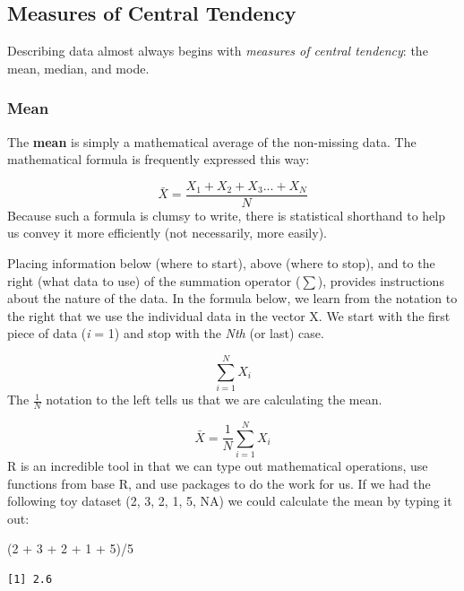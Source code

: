 \documentclass[
  11pt,
]{book}
\newenvironment{Shaded}{\begin{snugshade}}{\end{snugshade}}
\newcommand{\DecValTok}[1]{\textcolor[rgb]{0.00,0.00,0.81}{#1}}
\newcommand{\NormalTok}[1]{#1}
\newcommand{\SpecialCharTok}[1]{\textcolor[rgb]{0.00,0.00,0.00}{#1}}
\begin{document}
\hypertarget{measures-of-central-tendency}{%
\subsection{Measures of Central Tendency}\label{measures-of-central-tendency}}

Describing data almost always begins with \emph{measures of central tendency}: the mean, median, and mode.

\hypertarget{mean}{%
\subsubsection{Mean}\label{mean}}

The \textbf{mean} is simply a mathematical average of the non-missing data. The mathematical formula is frequently expressed this way:

\[\bar{X} = \frac{X_{1} + X_{2} + X_{3}...+ X_{N}}{N}\]
Because such a formula is clumsy to write, there is statistical shorthand to help us convey it more efficiently (not necessarily, more easily).

Placing information below (where to start), above (where to stop), and to the right (what data to use) of the summation operator (\(\sum\)), provides instructions about the nature of the data. In the formula below, we learn from the notation to the right that we use the individual data in the vector X. We start with the first piece of data (\emph{i} = 1) and stop with the \emph{Nth} (or last) case.

\[\sum_{i=1}^{N}X_{i}\]
The \(\frac{1}{N}\) notation to the left tells us that we are calculating the mean.

\[\bar{X}=\frac{1}{N}\sum_{i=1}^{N}X_{i}\]
R is an incredible tool in that we can type out mathematical operations, use functions from base R, and use packages to do the work for us. If we had the following toy dataset (2, 3, 2, 1, 5, NA) we could calculate the mean by typing it out:

\begin{Shaded}
\begin{Highlighting}[]
\NormalTok{(}\DecValTok{2} \SpecialCharTok{+} \DecValTok{3} \SpecialCharTok{+} \DecValTok{2} \SpecialCharTok{+} \DecValTok{1} \SpecialCharTok{+} \DecValTok{5}\NormalTok{)}\SpecialCharTok{/}\DecValTok{5}
\end{Highlighting}
\end{Shaded}

\begin{verbatim}
[1] 2.6
\end{verbatim}
\end{document}
